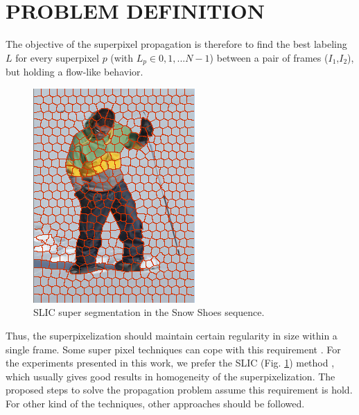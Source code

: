 \section{PROBLEM DEFINITION}
\label{sec:proposed_approach}

The objective of the superpixel propagation is
therefore to find the best labeling $L$ for every superpixel $p$
(with $L_p \in {0,1,...N-1}$) between a pair
of frames ($I_{1}$,$I_{2}$), but holding a flow-like behavior.
   \begin{figure}[thpb]
      \centering
      \includegraphics[height=0.22\textheight]{images/segmentation.png}
      \caption{SLIC super segmentation in the Snow Shoes sequence.}
      \label{figurelabel_segmentation}
   \end{figure}
Thus, the superpixelization should maintain certain
regularity in size within a single frame. Some super
pixel techniques can cope with this requirement \cite{c9}\cite{c10}.
For the experiments presented in this work, we prefer
the SLIC (Fig. \ref{figurelabel_segmentation}) method \cite{c9}, which usually gives
good results in homogeneity of the superpixelization.
The proposed steps to solve the propagation problem
assume this requirement is hold. For other kind of the
techniques, other approaches should be followed.


